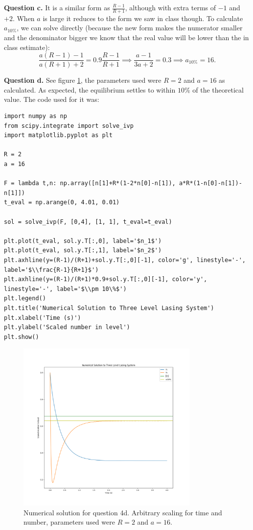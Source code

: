 \documentclass[letterpaper, reqno,11pt]{article}
\begin{document}
{\medskip\noindent\bf Question c.} It is a similar form as $\frac{R-1}{R+1}$, although with extra terms of $-1$ and $+2$. When $a$ is large it reduces to the form we saw in class though. To calculate $a_{10\%}$, we can solve directly (because the new form makes the numerator smaller and the denominator bigger we know that the real value will be lower than the in class estimate):
\[
\frac{a(R-1)-1}{a(R+1)+2}=0.9 \frac{R-1}{R+1}\implies \frac{a-1}{3a+2}=0.3\implies a_{10\%}=16
.\]

{\medskip\noindent\bf Question d.} See figure \ref{fig:q4d}, the parameters used were $R=2$ and $a=16$ as calculated. As expected, the equilibrium settles to within $10\%$ of the theoretical value. The code used for it was:
\begin{lstlisting}
import numpy as np
from scipy.integrate import solve_ivp
import matplotlib.pyplot as plt

R = 2
a = 16

F = lambda t,n: np.array([n[1]+R*(1-2*n[0]-n[1]), a*R*(1-n[0]-n[1])-n[1]])
t_eval = np.arange(0, 4.01, 0.01)

sol = solve_ivp(F, [0,4], [1, 1], t_eval=t_eval)

plt.plot(t_eval, sol.y.T[:,0], label='$n_1$')
plt.plot(t_eval, sol.y.T[:,1], label='$n_2$')
plt.axhline(y=(R-1)/(R+1)+sol.y.T[:,0][-1], color='g', linestyle='-', label='$\\frac{R-1}{R+1}$')
plt.axhline(y=(R-1)/(R+1)*0.9+sol.y.T[:,0][-1], color='y', linestyle='-', label='$\\pm 10\%$')
plt.legend()
plt.title('Numerical Solution to Three Level Lasing System')
plt.xlabel('Time (s)')
plt.ylabel('Scaled number in level')
plt.show()

\end{lstlisting}

\begin{figure}[htpb]
    \centering
    \includegraphics[width=0.8\textwidth]{q4}
    \caption{Numerical solution for question 4d. Arbitrary scaling for time and number, parameters used were $R=2$ and $a=16$.}
    \label{fig:q4d}
\end{figure}
\end{document}
